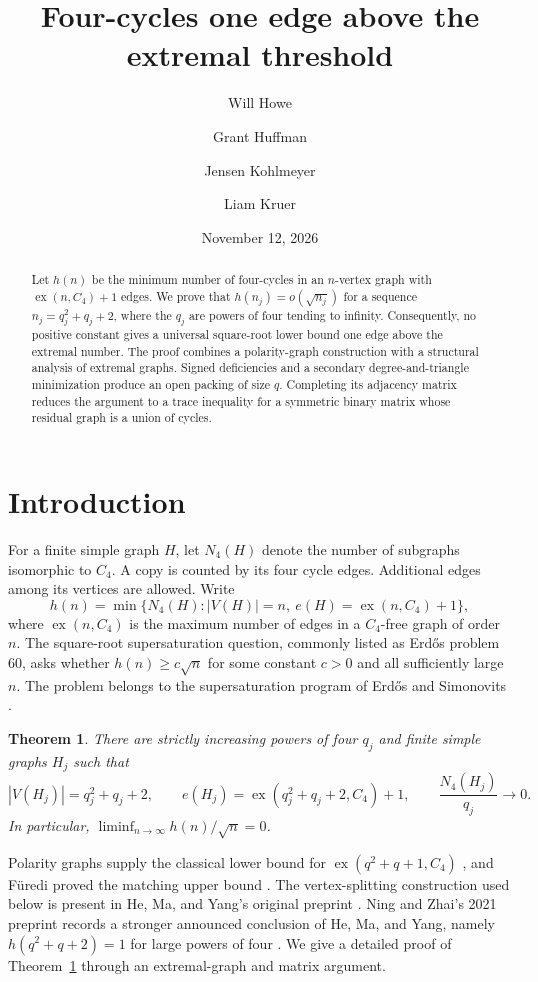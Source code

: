 \documentclass[11pt,reqno]{amsart}
\title[Four-cycles above the extremal threshold]{Four-cycles one edge above the extremal threshold}
\author[W. Howe]{Will Howe}
\author[G. Huffman]{Grant Huffman}
\author[J. Kohlmeyer]{Jensen Kohlmeyer}
\author[L. Kruer]{Liam Kruer}
\date{November 12, 2026}
\newtheorem{theorem}{Theorem}[section]
\theoremstyle{definition}
\theoremstyle{remark}
\numberwithin{equation}{section}
\DeclareMathOperator{\ex}{ex}
\begin{document}
\begin{abstract}
Let $h(n)$ be the minimum number of four-cycles in an $n$-vertex graph with
$\ex(n,C_4)+1$ edges. We prove that $h(n_j)=o(\sqrt{n_j})$ for a sequence
$n_j=q_j^2+q_j+2$, where the $q_j$ are powers of four tending to infinity.
Consequently, no positive constant gives a universal square-root lower bound
one edge above the extremal number. The proof combines a polarity-graph
construction with a structural analysis of extremal graphs. Signed
deficiencies and a secondary degree-and-triangle minimization produce an
open packing of size $q$. Completing its adjacency matrix reduces the
argument to a trace inequality for a symmetric binary matrix whose
residual graph is a union of cycles.
\end{abstract}
\maketitle
\raggedbottom

\section{Introduction}

For a finite simple graph $H$, let $N_4(H)$ denote the number of subgraphs
isomorphic to $C_4$. A copy is counted by its four cycle edges. Additional
edges among its vertices are allowed. Write
\[
 h(n)=\min\{N_4(H): |V(H)|=n,\ e(H)=\ex(n,C_4)+1\},
\]
where $\ex(n,C_4)$ is the maximum number of edges in a $C_4$-free graph
of order $n$. The square-root supersaturation question, commonly listed
as Erd\H{o}s problem 60, asks whether $h(n)\ge c\sqrt n$ for some
constant $c>0$ and all sufficiently large $n$. The problem belongs to
the supersaturation program of Erd\H{o}s and Simonovits
\cite{erdos-simonovits,hmy2023}.

\begin{theorem}\label{thm:main}
There are strictly increasing powers of four $q_j$ and finite simple
graphs $H_j$ such that
\[
 |V(H_j)|=q_j^2+q_j+2,\qquad
 e(H_j)=\ex(q_j^2+q_j+2,C_4)+1,\qquad
 \frac{N_4(H_j)}{q_j}\longrightarrow0.
\]
In particular, $\liminf_{n\to\infty}h(n)/\sqrt n=0$.
\end{theorem}

Polarity graphs supply the classical lower bound for $\ex(q^2+q+1,C_4)$
\cite{brown,ers}, and F\"uredi proved the matching upper bound
\cite{furedi}. The vertex-splitting construction used below is present in
He, Ma, and Yang's original preprint \cite[Section~10]{hmy2019}.
Ning and Zhai's 2021 preprint records a stronger announced conclusion
of He, Ma, and Yang, namely $h(q^2+q+2)=1$ for large powers of four
\cite[Introduction]{ning-zhai}. We give a detailed proof of
Theorem~\ref{thm:main} through an extremal-graph and matrix argument.
\end{document}
